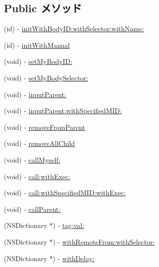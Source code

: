 \subsection*{Public メソッド}
\begin{DoxyCompactItemize}
\item 
(id) -\/ \hyperlink{interface_messenger_system_a1127377a8d677d41693b435758790e79}{initWithBodyID:withSelector:withName:}
\item 
(id) -\/ \hyperlink{interface_messenger_system_a12fac5bf1d29c2b960e02dab4db80944}{initWithManual}
\item 
(void) -\/ \hyperlink{interface_messenger_system_a2a5f63ed86009e8b451bbbb621e9a94b}{setMyBodyID:}
\item 
(void) -\/ \hyperlink{interface_messenger_system_aafb5a2e5d48a09627f32a4d3c2e3fa29}{setMyBodySelector:}
\item 
(void) -\/ \hyperlink{interface_messenger_system_a2dc1b363d2e1b00f232fd829225a9ff3}{inputParent:}
\item 
(void) -\/ \hyperlink{interface_messenger_system_ae7f62ea0ebdb51b5f2628f3002add7e7}{inputParent:withSpecifiedMID:}
\item 
(void) -\/ \hyperlink{interface_messenger_system_a1b95b2f06c63a72a776c853d74e11b03}{removeFromParent}
\item 
(void) -\/ \hyperlink{interface_messenger_system_abfbdbb7d723b910d012d980daacbcd9b}{removeAllChild}
\item 
(void) -\/ \hyperlink{interface_messenger_system_a0d78a7be460a84be04e67d73ddcf4248}{callMyself:}
\item 
(void) -\/ \hyperlink{interface_messenger_system_ae9f0c6c7daf251eb28aad584b1eca292}{call:withExec:}
\item 
(void) -\/ \hyperlink{interface_messenger_system_ae923fe829663d8974dc34063bd32c4a2}{call:withSpecifiedMID:withExec:}
\item 
(void) -\/ \hyperlink{interface_messenger_system_acf758deab41281c54d928be2a72fc9ba}{callParent:}
\item 
(NSDictionary $\ast$) -\/ \hyperlink{interface_messenger_system_ad4e20b8da148b72f520986386c7fb8a5}{tag:val:}
\item 
(NSDictionary $\ast$) -\/ \hyperlink{interface_messenger_system_ad7b796c0354f4a6f380392421d4abc0d}{withRemoteFrom:withSelector:}
\item 
(NSDictionary $\ast$) -\/ \hyperlink{interface_messenger_system_ac424d46f571c01154893e4747a665930}{withDelay:}
\item 

\end{DoxyCompactItemize}
